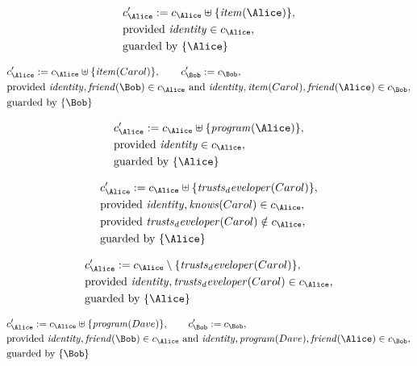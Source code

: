 \begin{align*}
&
c'_
{
\Alice
}
 := 
c_
{
\Alice
}
 \uplus 
\{
\mathit{
item
}
(
\Alice
)
\}
,\\
&
\text{provided } 
\mathit{
identity
}
 \in c_
{
\Alice
}
,\\
&
\text{guarded by } \{
\Alice
\}
\end{align*}

\begin{align*}
&
c'_
{
\Alice
}
 := 
c_
{
\Alice
}
 \uplus 
\{
\mathit{
item
}
(
Carol
)
\}
, \qquad 
c'_
{
\Bob
}
 := 
c_
{
\Bob
}
,\\
&
\text{provided } 
\mathit{
identity
}
,
\mathit{
friend
}
(
\Bob
)
 \in c_
{
\Alice
}
 \text{ and } 
\mathit{
identity
}
,
\mathit{
item
}
(
Carol
)
,
\mathit{
friend
}
(
\Alice
)
 \in c_
{
\Bob
}
,\\
&
\text{guarded by } \{
\Bob
\}
\end{align*}

\begin{align*}
&
c'_
{
\Alice
}
 := 
c_
{
\Alice
}
 \uplus 
\{
\mathit{
program
}
(
\Alice
)
\}
,\\
&
\text{provided } 
\mathit{
identity
}
 \in c_
{
\Alice
}
,\\
&
\text{guarded by } \{
\Alice
\}
\end{align*}

\begin{align*}
&
c'_
{
\Alice
}
 := 
c_
{
\Alice
}
 \uplus 
\{
\mathit{
trusts_developer
}
(
Carol
)
\}
,\\
&
\text{provided } 
\mathit{
identity
}
,
\mathit{
knows
}
(
Carol
)
 \in c_
{
\Alice
}
,\\
&
\text{provided } 
\mathit{
trusts_developer
}
(
Carol
)
 \notin c_
{
\Alice
}
,\\
&
\text{guarded by } \{
\Alice
\}
\end{align*}

\begin{align*}
&
c'_
{
\Alice
}
 := 
c_
{
\Alice
}
 \setminus 
\{
\mathit{
trusts_developer
}
(
Carol
)
\}
,\\
&
\text{provided } 
\mathit{
identity
}
,
\mathit{
trusts_developer
}
(
Carol
)
 \in c_
{
\Alice
}
,\\
&
\text{guarded by } \{
\Alice
\}
\end{align*}

\begin{align*}
&
c'_
{
\Alice
}
 := 
c_
{
\Alice
}
 \uplus 
\{
\mathit{
program
}
(
Dave
)
\}
, \qquad 
c'_
{
\Bob
}
 := 
c_
{
\Bob
}
,\\
&
\text{provided } 
\mathit{
identity
}
,
\mathit{
friend
}
(
\Bob
)
 \in c_
{
\Alice
}
 \text{ and } 
\mathit{
identity
}
,
\mathit{
program
}
(
Dave
)
,
\mathit{
friend
}
(
\Alice
)
 \in c_
{
\Bob
}
,\\
&
\text{guarded by } \{
\Bob
\}
\end{align*}
